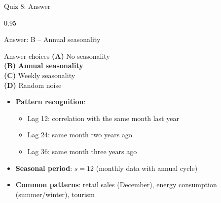 \documentclass[9pt, aspectratio=169, t]{beamer}
\begin{document}
\begin{frame}{Quiz 8: Answer}
    \begin{cminipage}{0.95\textwidth}
    \begin{exampleblock}{Answer: B -- Annual seasonality}
    {\footnotesize
    \begin{block}{Answer choices}
        \textcolor{MainBlue}{\textbf{(A)}} No seasonality \incorrect\\[2pt]
        \textcolor{MainBlue}{\textbf{(B)}} \textbf{\textcolor{Forest}{Annual seasonality}} \correct\\[2pt]
        \textcolor{MainBlue}{\textbf{(C)}} Weekly seasonality \incorrect\\[2pt]
        \textcolor{MainBlue}{\textbf{(D)}} Random noise \incorrect
    \end{block}

        \vspace{0.1cm}

        \begin{itemize}\setlength{\itemsep}{1pt}
            \item \textbf{Pattern recognition}:
                \begin{itemize}\setlength{\itemsep}{0pt}
                    \item Lag 12: correlation with the same month last year
                    \item Lag 24: same month two years ago
                    \item Lag 36: same month three years ago
                \end{itemize}
            \item \textbf{Seasonal period}: $s = 12$ (monthly data with annual cycle)
            \item \textbf{Common patterns}: retail sales (December), energy consumption (summer/winter), tourism
        \end{itemize}
    }
    \end{exampleblock}

    \end{cminipage}
\end{frame}
\end{document}
